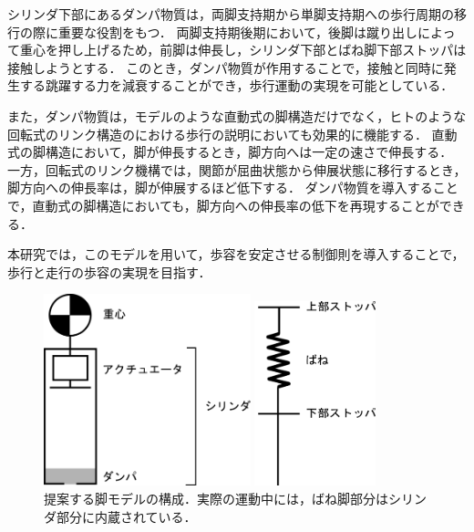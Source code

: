 シリンダ下部にあるダンパ物質は，両脚支持期から単脚支持期への歩行周期の移行の際に重要な役割をもつ．
両脚支持期後期において，後脚は蹴り出しによって重心を押し上げるため，前脚は伸長し，シリンダ下部とばね脚下部ストッパは接触しようとする．
このとき，ダンパ物質が作用することで，接触と同時に発生する跳躍する力を減衰することができ，歩行運動の実現を可能としている．

また，ダンパ物質は，モデルのような直動式の脚構造だけでなく，ヒトのような回転式のリンク構造のにおける歩行の説明においても効果的に機能する．
直動式の脚構造において，脚が伸長するとき，脚方向へは一定の速さで伸長する．
一方，回転式のリンク機構では，関節が屈曲状態から伸展状態に移行するとき，脚方向への伸長率は，脚が伸展するほど低下する．
ダンパ物質を導入することで，直動式の脚構造においても，脚方向への伸長率の低下を再現することができる．

本研究では，このモデルを用いて，歩容を安定させる制御則を導入することで，歩行と走行の歩容の実現を目指す．

\begin{figure}[htbp]
 \begin{minipage}[b]{.5\linewidth}
 \centering
 \includegraphics[width = 6.0cm, clip]{./fig/leg_cylinder.png}
 \end{minipage}
 \begin{minipage}[b]{.5\linewidth}
 \centering
 \includegraphics[width = 3.5cm,clip]{./fig/leg_spring.png}
 \end{minipage}
\caption{提案する脚モデルの構成．実際の運動中には，ばね脚部分はシリンダ部分に内蔵されている．\label{model}}
\end{figure}

